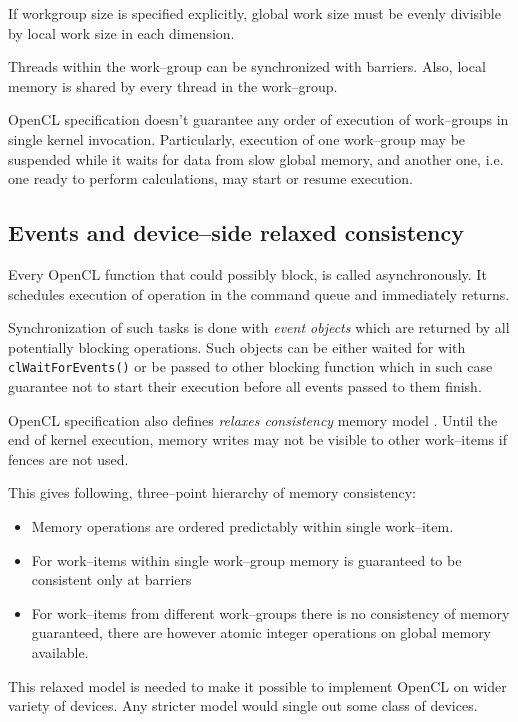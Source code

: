 If workgroup size is specified explicitly, global work size must be evenly
divisible by local work size in each dimension.

Threads within the work--group can be synchronized with barriers. Also, local
memory is shared by every thread in the work--group.

OpenCL specification doesn't guarantee any order of execution of work--groups
in single kernel invocation. Particularly, execution of one work--group may be
suspended while it waits for data from slow global memory, and another one,
i.e. one ready to perform calculations, may start or resume execution.

\subsection{Events and device--side relaxed consistency}
\label{sub:clevents}

Every OpenCL function that could possibly block, is called asynchronously. It
schedules execution of operation in the command queue and immediately returns.

Synchronization of such tasks is done with \emph{event objects} which are
returned by all potentially blocking operations. Such objects can be either
waited for with \texttt{clWaitForEvents()} or be passed to other blocking
function which in such case guarantee not to start their execution before all
events passed to them finish.

OpenCL specification also defines \emph{relaxes consistency} memory model \parencite{gaster2012heterogeneous}.
Until the end of kernel execution, memory writes may not be visible to other
work--items if fences are not used.

This gives following, three--point hierarchy of memory consistency:
\begin{itemize}
  \item Memory operations are ordered predictably within single work--item.
  \item For work--items within single work--group memory is guaranteed to be
    consistent only at barriers
  \item For work--items from different work--groups there is no consistency of
    memory guaranteed, there are however atomic integer operations on global
    memory available.
\end{itemize}

This relaxed model is needed to make it possible to implement OpenCL on wider
variety of devices. Any stricter model would single out some class of devices.

